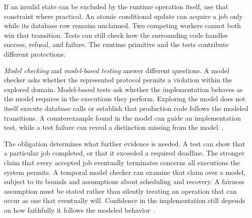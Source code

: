 
If an invalid state can be excluded by the runtime operation itself, use that constraint where practical. An atomic conditional update can acquire a job only while its database row remains unclaimed. Two competing workers cannot both win that transition. Tests can still check how the surrounding code handles success, refusal, and failure. The runtime primitive and the tests contribute different protections.


\emph{Model checking} and \emph{model-based testing} answer different questions. A model checker asks whether the represented protocol permits a violation within the explored domain. Model-based tests ask whether the implementation behaves as the model requires in the executions they perform. Exploring the model does not itself execute database calls or establish that production code follows the modeled transitions. A counterexample found in the model can guide an implementation test, while a test failure can reveal a distinction missing from the model~\citep{baier-katoen2008,utting2012taxonomy}.


The obligation determines what further evidence is needed. A test can show that a particular job completed, or that it exceeded a required deadline. The stronger claim that every accepted job eventually terminates concerns all executions the system permits. A temporal model checker can examine that claim over a model, subject to its bounds and assumptions about scheduling and recovery. A fairness assumption must be stated rather than silently treating an operation that can occur as one that eventually will. Confidence in the implementation still depends on how faithfully it follows the modeled behavior~\citep{baier-katoen2008,lamport2002}.

